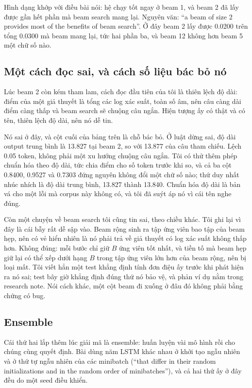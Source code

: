%
Hình dạng khớp với điều bài nói: hệ chạy tốt ngay ở beam 1, và beam 2 đã lấy
được gần hết phần mà beam search mang lại. Nguyên văn:
\enquote{a beam of size 2 provides most of the benefits of beam search}. Ở đây
beam 2 lấy được 0.0200 trên tổng 0.0300 mà beam mang lại, tức hai phần ba, và
beam 12 không hơn beam 5 một chữ số nào.

\subsection*{Một cách đọc sai, và cách số liệu bác bỏ nó}

%
Lúc beam 2 còn kém tham lam, cách đọc đầu tiên của tôi là thiên lệch độ dài:
điểm của một giả thuyết là tổng các log xác suất, toàn số âm, nên câu càng dài
điểm càng thấp và beam search sẽ chuộng câu ngắn. Hiện tượng ấy có thật và có
tên, thiên lệch độ dài, nên nó dễ tin.

Nó sai ở đây, và cột cuối của bảng trên là chỗ bác bỏ. Ở luật dừng sai, độ dài
output trung bình là 13.827 tại beam 2, so với 13.877 của câu tham chiếu. Lệch
0.05 token, không phải một xu hướng chuộng câu ngắn. Tôi có thử thêm phép chuẩn
hóa theo độ dài, tức chia điểm cho số token trước khi so, và cả ba cột 0.8400,
0.9527 và 0.7303 đứng nguyên không đổi một chữ số nào; thứ duy nhất nhúc nhích
là độ dài trung bình, 13.827 thành 13.840. Chuẩn hóa độ dài là bản vá cho một
lỗi mà corpus này không có, và tôi đã suýt áp nó vì cái tên nghe đúng.

Còn một chuyện về beam search tôi cũng tin sai, theo chiều khác. Tôi ghi lại vì
đây là cái bẫy rất dễ sập vào. Beam rộng sinh ra tập ứng viên bao tập của beam hẹp, nên
có vẻ hiển nhiên là nó phải trả về giả thuyết có log xác suất không thấp hơn.
Không đúng: mỗi bước chỉ giữ \(B\) ứng viên tốt nhất, và tiền tố mà beam hẹp giữ
lại có thể xếp dưới hạng \(B\) trong tập ứng viên lớn hơn của beam rộng, nên bị
loại mất. Tôi viết hẳn một test khẳng định tính đơn điệu ấy trước khi phát hiện
ra nó sai; test bây giờ khẳng định đúng thứ nó bảo vệ, và phản ví dụ nằm trong
research note. Nói cách khác, một cột beam đi xuống ở đâu đó không phải bằng
chứng có bug.

\subsection*{Ensemble}

%
Cái thứ hai lắp thêm lúc giải mã là ensemble: huấn luyện vài mô hình rồi cho
chúng cùng quyết định. Bài dùng năm LSTM khác nhau ở khởi tạo ngẫu nhiên và ở
thứ tự ngẫu nhiên của các minibatch (\enquote{that differ in their random
initializations and in the random order of minibatches}), và cả hai thứ ấy ở
đây đều do một seed điều khiển.

